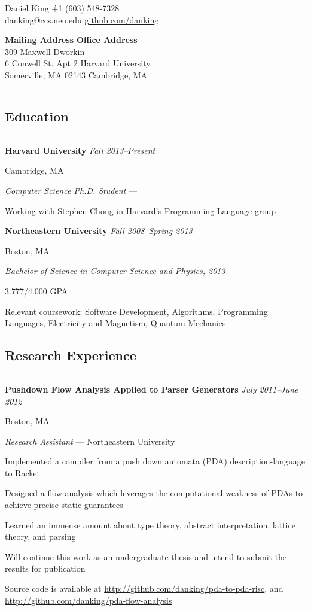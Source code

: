 \documentclass[10pt]{article}
\newenvironment{my-itemize}
  {\begin{itemize*}
   \renewcommand{\labelitemi}{$\angle$}
  }
  {\end{itemize*}}
\newcommand{\job}[6]{
  \begin{tabbing} {\bf #1} \` {\small \textit{#3}} \end{tabbing}
  \vspace{-6pt}
  {\small #2}
  \begin{my-itemize}
  \setlength\itemsep{1pt}
  \item [] {\textit{#4} \ifthenelse{\equal{#5}{}}
                                   {}
                                   {--- #5}}
  #6
  \end{my-itemize}
}
\newcommand{\heading}[2]{
  \subsection*{#1}
  \vspace{-10pt}
  \rule{2in}{.5pt}
  \vspace{-5pt}
  #2
}
\begin{document}
\begin{tabbing}{\Huge Daniel King} \`+1 (603) 548-7328\\
\normalsize danking@ccs.neu.edu \`\url{github.com/danking}
\end{tabbing}

\vspace{-10pt}

\begin{tabbing}
\textbf{Mailing Address}                \`\textbf{Office Address}\\
                                        \`309 Maxwell Dworkin\\
6 Conwell St. Apt 2                     \`Harvard University\\
Somerville, MA 02143                    \`Cambridge, MA\\
\end{tabbing}
\vspace{-25pt}
\rule{\linewidth}{.1pt}

\heading{Education}

\job{Harvard University}
    {Cambridge, MA}
    {Fall 2013--Present}
    {Computer Science Ph.D. Student}
    {}{
  \item Working with Stephen Chong in Harvard's Programming Language group
}

\job{Northeastern University}
    {Boston, MA}
    {Fall 2008--Spring 2013}
    {Bachelor of Science in Computer Science and Physics, 2013}
    {}{
  \item 3.777/4.000 GPA
  \item Relevant coursework: Software Development, Algorithms, Programming
    Languages, Electricity and Magnetism, Quantum Mechanics
}

\heading{Research Experience}

\job{Pushdown Flow Analysis Applied to Parser Generators}
    {Boston, MA}
    {July 2011--June 2012}
    {Research Assistant}
    {Northeastern University}{
  \item{Implemented a compiler from a push down automata (PDA)
    description-language to Racket}
  \item{Designed a flow analysis which leverages the computational weakness of
    PDAs to achieve precise static guarantees}
  \item{Learned an immense amount about type theory, abstract interpretation,
    lattice theory, and parsing}
  \item{Will continue this work as an undergraduate thesis and intend to submit
    the results for publication}
  \item{Source code is available at
    \url{http://github.com/danking/pda-to-pda-risc}, and \\
    \url{http://github.com/danking/pda-flow-analysis}}
}
\end{document}
